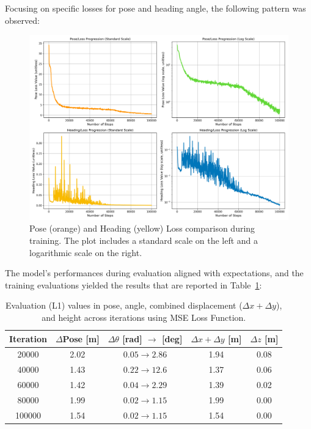 Focusing on specific losses for pose and heading angle, the following pattern was observed:
\begin{figure}[H]
    \centering
    \includegraphics[width=1\linewidth]{LateX//figs/mse_pose_heading_loss_comparison.png}
    \caption{Pose (orange) and Heading (yellow) Loss comparison during training. The plot includes a standard scale on the left and a logarithmic scale on the right.}
    \label{fig:pose-heading-loss}
\end{figure}

The model's performances during evaluation aligned with expectations, and the training evaluations yielded the results that are reported in Table~\ref{tab:pose_variations_mse}:
\begin{table}[H]
    \centering
    \scriptsize
    \renewcommand{\arraystretch}{1.2} 
    \setlength{\tabcolsep}{10pt}
    \begin{tabular}{c c c c c}
        \toprule
        \textbf{Iteration} & \textbf{$\Delta$Pose [m]} & \textbf{$\Delta \theta$ [rad] $\rightarrow$ [deg]} & \textbf{$\Delta x + \Delta y$ [m]} & \textbf{$\Delta z$ [m]} \\
        \midrule
        \num{20000}  & 2.02 & $0.05 \rightarrow 2.86$  & 1.94 & 0.08 \\
        \num{40000}  & 1.43 & $0.22 \rightarrow 12.6$  & 1.37 & 0.06 \\
        \num{60000}  & 1.42 & $0.04 \rightarrow 2.29$  & 1.39 & 0.02 \\
        \num{80000}  & 1.99 & $0.02 \rightarrow 1.15$  & 1.99 & 0.00 \\
        \num{100000} & 1.54 & $0.02 \rightarrow 1.15$  & 1.54 & 0.00 \\
        \bottomrule
    \end{tabular}
    \caption{Evaluation (L1) values in pose, angle, combined displacement ($\Delta x + \Delta y$), and height across iterations using MSE Loss Function.}
    \label{tab:pose_variations_mse}
\end{table}

